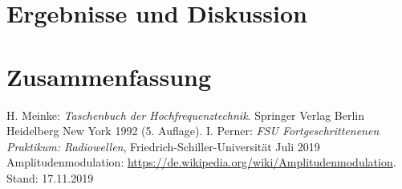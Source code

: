 \documentclass[a4paper,twoside,final]{article}
\begin{document}
\newpage
\section{Ergebnisse und Diskussion}


\section{Zusammenfassung}



\begin{thebibliography}{xxx}
	H. Meinke: \textit{Taschenbuch der Hochfrequenztechnik}. Springer Verlag Berlin Heidelberg New York 1992 (5. Auflage).
  I. Perner: \textit{FSU Fortgeschrittenenen Praktikum: Radiowellen}, Fried\-rich-Schil\-ler-Uni\-versi\-tät Juli 2019
  Amplitudenmodulation: \url{https://de.wikipedia.org/wiki/Amplitudenmodulation}. Stand: 17.11.2019
\end{thebibliography}
\end{document}
